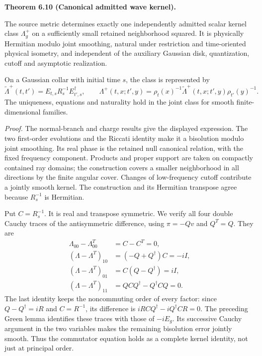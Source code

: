 \documentclass[
  english,
  11pt,
  reqno]{amsart}
\makeatletter
\newcommand{\pandocstatementheading}[1]{%
  \par\if@nobreak\else
    \addpenalty{\@beginparpenalty}%
    \addvspace{.5\baselineskip plus .2\baselineskip minus .2\baselineskip}%
  \fi
  {\normalfont\bfseries #1\par}%
  \nobreak\@afterindenttrue\@afterheading
}
\makeatother
\begin{document}
\pandocstatementheading{\leavevmode{}\label{thm:online-canonical-wave-kernel}Theorem 6.10 (Canonical admitted wave kernel).}

The source metric determines exactly one independently admitted scalar
kernel class \(\Lambda_g^+\) on a sufficiently small retained
neighborhood squared. It is physically Hermitian modulo joint smoothing,
natural under restriction and time-oriented physical isometry, and
independent of the auxiliary Gaussian disk, quantization, cutoff and
asymptotic realization.

On a Gaussian collar with initial time \(s\), the class is represented
by%
 \[
\widetilde\Lambda^+(t,t')
=E_{t,s}R_s^{-1}E_{t',s}^\dagger,
\qquad
\Lambda^+(t,x;t',y)
=\rho_t(x)^{-1}\widetilde\Lambda^+(t,x;t',y)\rho_{t'}(y)^{-1}.
\] The uniqueness, equations and naturality hold in the joint class for
smooth finite-dimensional families.

\emph{Proof.} The normal-branch and charge results give the displayed
expression. The two first-order evolutions and the Riccati identity make
it a bisolution modulo joint smoothing. Its real phase is the retained
null canonical relation, with the fixed frequency component. Products
and proper support are taken on compactly contained ray domains; the
construction covers a smaller neighborhood in all directions by the
finite angular cover. Changes of low-frequency cutoff contribute a
jointly smooth kernel. The construction and its Hermitian transpose
agree because \(R_s^{-1}\) is Hermitian.

Put \(C=R_s^{-1}\). It is real and transpose symmetric. We verify all
four double Cauchy traces of the antisymmetric difference, using
\(\pi=-Qv\) and \(Q^T=Q\). They are%
 \[
\begin{aligned}
\Lambda_{00}-\Lambda_{00}^T&=C-C^T=0,\\
(\Lambda-\Lambda^T)_{10}
&=(-Q+Q^\dagger)C=-iI,\\
(\Lambda-\Lambda^T)_{01}
&=C(Q-Q^\dagger)=iI,\\
(\Lambda-\Lambda^T)_{11}
&=QCQ^\dagger-Q^\dagger CQ=0.
\end{aligned}
\] The last identity keeps the noncommuting order of every factor: since
\(Q-Q^\dagger=iR\) and \(C=R^{-1}\), its difference is
\(iRCQ^\dagger-iQ^\dagger CR=0\). The preceding Green lemma identifies
these traces with those of \(-iE_g\). Its successive Cauchy argument in
the two variables makes the remaining bisolution error jointly smooth.
Thus the commutator equation holds as a complete kernel identity, not
just at principal order.
\end{document}
